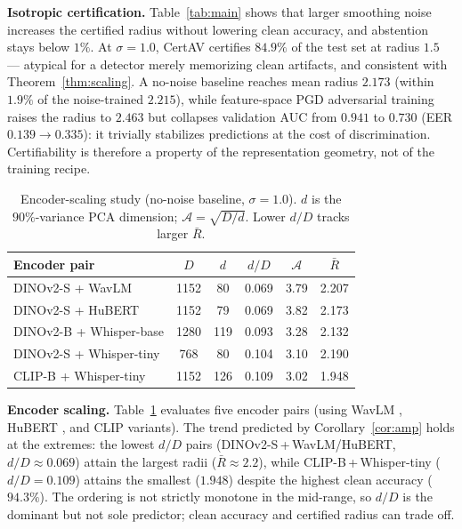 \documentclass{article}
\begin{document}
\noindent\textbf{Isotropic certification.} Table~\ref{tab:main} shows that larger smoothing noise increases the certified radius without lowering clean accuracy, and abstention stays below $1\%$. At $\sigma=1.0$, CertAV certifies $84.9\%$ of the test set at radius $1.5$ --- atypical for a detector merely memorizing clean artifacts, and consistent with Theorem~\ref{thm:scaling}. A no-noise baseline reaches mean radius $2.173$ (within $1.9\%$ of the noise-trained $2.215$), while feature-space PGD adversarial training raises the radius to $2.463$ but collapses validation AUC from $0.941$ to $0.730$ (EER $0.139\!\to\!0.335$): it trivially stabilizes predictions at the cost of discrimination. Certifiability is therefore a property of the representation geometry, not of the training recipe.

\begin{table}[t]
\centering
\caption{Encoder-scaling study (no-noise baseline, $\sigma=1.0$). $d$ is the $90\%$-variance PCA dimension; $\mathcal{A}=\sqrt{D/d}$. Lower $d/D$ tracks larger $\bar R$.}
\label{tab:encoder}
\scriptsize
\setlength{\tabcolsep}{3.0pt}
\begin{tabular}{lccccc}
\toprule
Encoder pair & $D$ & $d$ & $d/D$ & $\mathcal{A}$ & $\bar R$ \\
\midrule
DINOv2-S + WavLM        & 1152 & 80  & 0.069 & 3.79 & 2.207 \\
DINOv2-S + HuBERT       & 1152 & 79  & 0.069 & 3.82 & 2.173 \\
DINOv2-B + Whisper-base & 1280 & 119 & 0.093 & 3.28 & 2.132 \\
DINOv2-S + Whisper-tiny &  768 & 80  & 0.104 & 3.10 & 2.190 \\
CLIP-B + Whisper-tiny   & 1152 & 126 & 0.109 & 3.02 & 1.948 \\
\bottomrule
\end{tabular}
\vspace{-0.2cm}
\end{table}

\noindent\textbf{Encoder scaling.} Table~\ref{tab:encoder} evaluates five encoder pairs (using WavLM \cite{chen2022wavlm}, HuBERT \cite{hsu2021hubert}, and CLIP \cite{radford2021clip} variants). The trend predicted by Corollary~\ref{cor:amp} holds at the extremes: the lowest $d/D$ pairs (DINOv2-S\,+\,WavLM/HuBERT, $d/D\!\approx\!0.069$) attain the largest radii ($\bar R\!\approx\!2.2$), while CLIP-B\,+\,Whisper-tiny ($d/D\!=\!0.109$) attains the smallest ($1.948$) despite the highest clean accuracy ($94.3\%$). The ordering is not strictly monotone in the mid-range, so $d/D$ is the dominant but not sole predictor; clean accuracy and certified radius can trade off.
\end{document}
